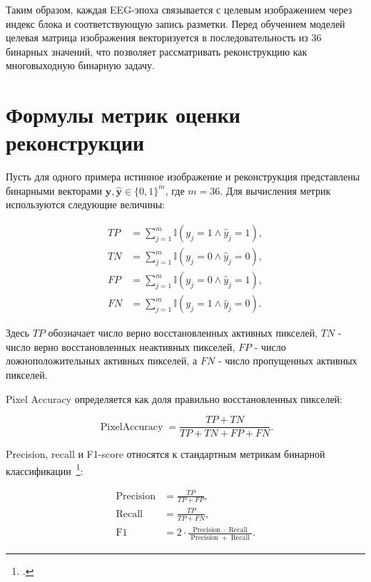 Таким образом, каждая EEG-эпоха связывается с целевым изображением через индекс блока и соответствующую запись разметки. Перед обучением моделей целевая матрица изображения векторизуется в последовательность из 36 бинарных значений, что позволяет рассматривать реконструкцию как многовыходную бинарную задачу.

\section*{Формулы метрик оценки реконструкции}
\label{app:metrics}

Пусть для одного примера истинное изображение и реконструкция представлены бинарными векторами $\mathbf{y}, \hat{\mathbf{y}} \in \{0,1\}^{m}$, где $m = 36$. Для вычисления метрик используются следующие величины:

\begin{align}
TP &= \sum_{j=1}^{m} \mathbb{I}(y_j = 1 \land \hat{y}_j = 1), \\
TN &= \sum_{j=1}^{m} \mathbb{I}(y_j = 0 \land \hat{y}_j = 0), \\
FP &= \sum_{j=1}^{m} \mathbb{I}(y_j = 0 \land \hat{y}_j = 1), \\
FN &= \sum_{j=1}^{m} \mathbb{I}(y_j = 1 \land \hat{y}_j = 0).
\end{align}

Здесь $TP$ обозначает число верно восстановленных активных пикселей, $TN$ - число верно восстановленных неактивных пикселей, $FP$ - число ложноположительных активных пикселей, а $FN$ - число пропущенных активных пикселей.

Pixel Accuracy определяется как доля правильно восстановленных пикселей:

\begin{equation}
\operatorname{PixelAccuracy} =
\frac{TP + TN}{TP + TN + FP + FN}.
\end{equation}

Precision, recall и F1-score относятся к стандартным метрикам бинарной классификации~\footcite{10.1016/j.ipm.2009.03.002}:

\begin{align}
\operatorname{Precision} &= \frac{TP}{TP + FP}, \\
\operatorname{Recall} &= \frac{TP}{TP + FN}, \\
\operatorname{F1} &= 2 \cdot
\frac{\operatorname{Precision} \cdot \operatorname{Recall}}
{\operatorname{Precision} + \operatorname{Recall}}.
\end{align}

